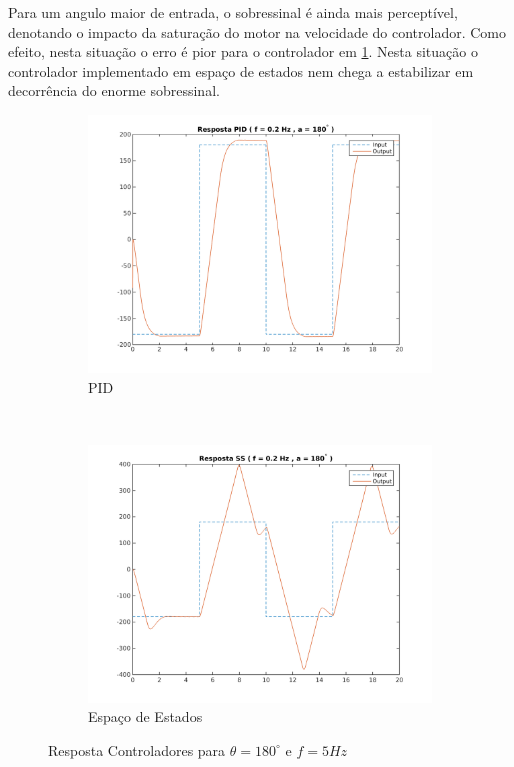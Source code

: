 \documentclass[a4paper,11pt]{article}
\begin{document}
Para um angulo maior de entrada, o sobressinal é ainda mais perceptível, denotando o impacto da saturação do motor na velocidade do controlador. Como efeito, nesta situação o erro é pior para o controlador em \ref{fig:control_s180dt5}. Nesta situação o controlador implementado em espaço de estados nem chega a estabilizar em decorrência do enorme sobressinal.

\begin{figure}[H]
    \centering
    \begin{subfigure}[b]{0.5\textwidth}
        \centering
        \includegraphics[width = \linewidth]{tex/img/quanserpid_s180num5.png}
        \caption{PID}
    \end{subfigure}%
    ~ 
    \begin{subfigure}[b]{0.5\textwidth}
        \centering
        \includegraphics[width = \linewidth]{tex/img/quanserss_s180num5.png}
        \caption{Espaço de Estados}
    \end{subfigure}%
    \caption{Resposta Controladores para $\theta=180^\circ$ e $f = 5Hz$}
    \label{fig:control_s180dt5}
\end{figure}
\end{document}
